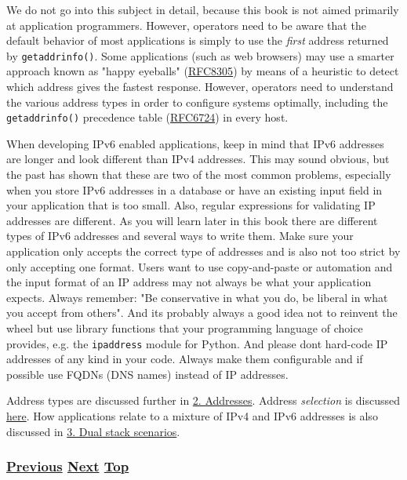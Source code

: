 \documentclass[
]{article}
\begin{document}
We do not go into this subject in detail, because this book is not aimed
primarily at application programmers. However, operators need to be
aware that the default behavior of most applications is simply to use
the \emph{first} address returned by \texttt{getaddrinfo()}. Some
applications (such as web browsers) may use a smarter approach known as
"happy eyeballs"
(\href{https://www.rfc-editor.org/info/rfc8305}{RFC8305}) by means of a
heuristic to detect which address gives the fastest response. However,
operators need to understand the various address types in order to
configure systems optimally, including the \texttt{getaddrinfo()}
precedence table
(\href{https://www.rfc-editor.org/info/rfc6724}{RFC6724}) in every host.

When developing IPv6 enabled applications, keep in mind that IPv6
addresses are longer and look different than IPv4 addresses. This may
sound obvious, but the past has shown that these are two of the most
common problems, especially when you store IPv6 addresses in a database
or have an existing input field in your application that is too small.
Also, regular expressions for validating IP addresses are different. As
you will learn later in this book there are different types of IPv6
addresses and several ways to write them. Make sure your application
only accepts the correct type of addresses and is also not too strict by
only accepting one format. Users want to use copy-and-paste or
automation and the input format of an IP address may not always be what
your application expects. Always remember: "Be conservative in what you
do, be liberal in what you accept from others". And it\textquotesingle s
probably always a good idea not to reinvent the wheel but use library
functions that your programming language of choice provides, e.g. the
\texttt{ipaddress} module for Python. And please don\textquotesingle t
hard-code IP addresses of any kind in your code. Always make them
configurable and if possible use FQDNs (DNS names) instead of IP
addresses.

Address types are discussed further in \hyperref[addresses]{2.
Addresses}. Address \emph{selection} is discussed
\hyperref[source-and-destination-address-selection]{here}. How
applications relate to a mixture of IPv4 and IPv6 addresses is also
discussed in \hyperref[dual-stack-scenarios]{3. Dual stack scenarios}.

\subsubsection{\texorpdfstring{\hyperref[how-a-user-sees-ipv6]{Previous}
\hyperref[how-a-network-operations-center-sees-ipv6]{Next}
\hyperref[introduction-and-foreword]{Top}}{Previous Next Top}}\label{previous-next-top-2}
\end{document}
